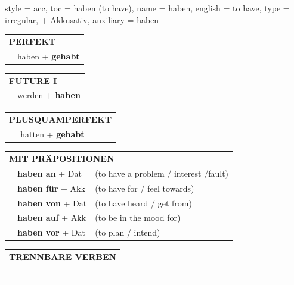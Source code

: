 \begin{verbentry}{
  style = {acc},
  toc = {haben (to have)},
  name = {haben},
  english = {to have},
  type = {irregular, + Akkusativ},
  auxiliary = {haben}
}
    \vspace{10pt}
 
    \begin{tabular}{rl}
     \multicolumn{2}{l}{\textbf{PERFEKT}}\\
    &haben + \textbf{gehabt}\\
  \end{tabular}
\hfill
   \begin{tabular}{rl}
   
    \multicolumn{2}{l}{\textbf{FUTURE I} }\\
    &werden + \textbf{haben}\\
 
  \end{tabular}
\hfill
   \begin{tabular}{rl}
      \multicolumn{2}{l}{\textbf{PLUSQUAMPERFEKT}}\\
    &hatten + \textbf{gehabt}\\
  \end{tabular}
  


  \vspace{10pt}

   \begin{tabular}{lll}
      \multicolumn{3}{l}{\textbf{MIT PRÄPOSITIONEN}}\\
& \textbf{haben an} + Dat & (to have a problem / interest /fault)\\
& \textbf{haben für} + Akk & (to have for / feel towards)\\
&\textbf{haben von} + Dat & (to have heard / get from)\\
&\textbf{haben auf} + Akk & (to be in the mood for)\\
&\textbf{haben vor} + Dat & (to plan / intend)
  \end{tabular}
\hfill
\begin{tabular}{lll}
\multicolumn{3}{l}{\textbf{TRENNBARE VERBEN}}\\
& \textbf{---} & \\
\end{tabular}




  \vspace{-5pt}
\end{verbentry}

